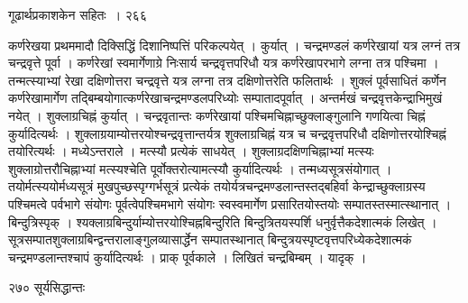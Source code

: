 \documentclass[11pt, openany]{book}
\begin{document}
\newpage


\hspace{3cm} गूढार्थप्रकाशकेन सहितः~। \hfill २६६
\vspace{1cm}


\noindent कर्णरेखया प्रथममादौ दिक्सिद्धिं दिशानिष्पत्तिं परिकल्पयेत् । कुर्यात् । चन्द्रमण्डलं कर्णरेखायां यत्र लग्नं तत्र चन्द्रवृत्ते पूर्वा । कर्णरेखां स्वमार्गेणाग्रे निःसार्य चन्द्रवृत्तपरिधौ यत्र कर्णरेखापरभागे लग्ना तत्र पश्चिमा । तन्मत्स्याभ्यां रेखा दक्षिणोत्तरा चन्द्रवृत्ते यत्र लग्ना तत्र दक्षिणोत्तरेति फलितार्थः । शुक्लं पूर्वसाधितं कर्णेन कर्णरेखामार्गेण तद्बिम्बयोगात्कर्णरेखाचन्द्रमण्डलपरिध्योः सम्पातादपूर्वात् । अन्तर्मखं चन्द्रवृत्तकेन्द्राभिमुखं नयेत् । शुक्लाग्रचिह्नं कुर्यात् । चन्द्रवृतान्तः कर्णरेखायां पश्चिमचिह्नाच्छुक्लाङ्गुलानि गणयित्वा चिह्नं कुर्यादित्यर्थः । शुक्लाग्रयाम्योत्तरयोश्चन्द्रवृत्तान्तर्यत्र शुक्लाग्रचिह्नं यत्र च चन्द्रवृत्तपरिधौ दक्षिणोत्तरयोश्चिह्नं तयोरित्यर्थः । मध्येऽन्तराले । मत्स्यौ प्रत्येकं साधयेत् । शुक्लाग्रदक्षिणचिह्नाभ्यां मत्स्यः शुक्लाग्रोत्तरौचिह्नाभ्यां मत्स्यश्चेति पूर्वोक्तरोत्यामत्स्यौ कुर्यादित्यर्थः । तन्मध्यसूत्रसंयोगात् । तयोर्मत्स्ययोर्मध्यसूत्रं मुखपुच्छस्पृग्गर्भसूत्रं प्रत्येकं तयोर्यत्रचन्द्रमण्डलान्तस्तद्बहिर्वा केन्द्राच्छुक्लाग्रस्य पश्चिमत्वे पर्वभागे संयोगः पूर्वत्वेपश्चिमभागे संयोगः स्वस्वमार्गेण प्रसारितयोस्तयोः सम्पातस्तस्मात्स्थानात् । बिन्दुत्रिस्पृक् । श्यक्लाग्रबिन्दुर्याम्योत्तरयोश्चिह्नबिन्दुरिति बिन्दुत्रितयस्पर्शि धनुर्वृत्तैकदेशात्मकं लिखेत् । सूत्रसम्पातशुक्लाग्रबिन्द्वन्तरालाङ्गुलव्यासार्द्धेन सम्पातस्थानात् बिन्दुत्रयस्पृष्टवृत्तपरिध्येकदेशात्मकं चन्द्रमण्डलान्तश्चापं कुर्यादित्यर्थः । प्राक् पूर्वकाले । लिखितं चन्द्रबिम्बम् । यादृक् । 


\newpage

\noindent २७० \hspace{4cm} सूर्यसिद्धान्तः
\vspace{1cm}
\end{document}
